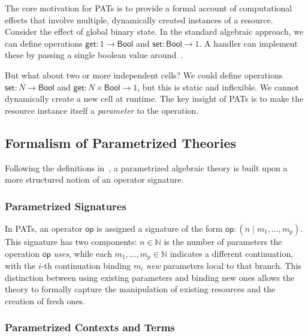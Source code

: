 \documentclass{article}
\theoremstyle{definition}
\theoremstyle{remark}
\newcommand{\BN}{\ensuremath{\mathbb N}}
\newcommand\bool{\mathsf{Bool}}
\newcommand\op{\mathsf{op}}
\newcommand\get{\mathsf{get}}
\newcommand\set{\mathsf{set}}
\begin{document}
The core motivation for PATs is to provide a formal account of computational effects that involve multiple, dynamically created instances of a resource.
Consider the effect of global binary state. In the standard algebraic approach, we can define operations $\get: 1 \to \bool$ and $\set: \bool \to 1$.
A handler can implement these by passing a single boolean value around~\cite{pretnar_introduction_2015}.

But what about two or more independent cells?
We could define operations $\set: N \to \bool$ and $\get: N \times \bool \to 1$, but this is static and inflexible.
We cannot dynamically create a new cell at runtime. The key insight of PATs is to make the resource instance itself a \emph{parameter} to the operation.

\subsection{Formalism of Parametrized Theories}

Following the definitions in~\cite{staton_instances_2013, staton_algebraic_2013}, a parametrized algebraic theory is built upon a more structured notion of an operator signature.

\subsubsection{Parametrized Signatures}

In PATs, an operator $\op$ is assigned a signature of the form $\op:(n\mid m_1,\dots ,m_p)$. This signature has two components:
$n \in \BN$ is the number of parameters the operation $\op$ \emph{uses}, while each
$m_1,\dots ,m_p \in \BN$ indicates a different continuation, with the $i$-th continuation binding $m_i$ \emph{new} parameters local to that branch.
This distinction between using existing parameters and binding new ones allows the theory to formally capture the manipulation of existing resources and the creation of fresh ones.

\subsubsection{Parametrized Contexts and Terms}
\end{document}
